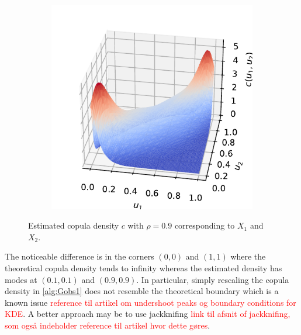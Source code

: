 \documentclass[../Thesis.tex]{subfiles}
\begin{document}
\begin{example}
\begin{figure}[H]
\begin{subfigure}[t]{0.5\linewidth}
            \includegraphics[width = \linewidth]{figures/ND examples/Gaussian copula sample pdf.pdf}
            \caption{}
        \end{subfigure}
        \caption{Estimated copula density $c$ with $\rho = 0.9$ corresponding to $X_1$ and $X_2$.}
        \label{fig:gaussian copula estimate}
    \end{figure}
    The noticeable difference is in the corners $(0,0)$ and $(1,1)$ where the theoretical copula density tends to infinity whereas the estimated density has modes at $(0.1,0.1)$ and $(0.9,0.9)$. In particular, simply rescaling the copula density in \autoref{alg:Gobs1} does not resemble the theoretical boundary which is a known issue \textcolor{red}{reference til artikel om undershoot peaks og boundary conditions for KDE}. A better approach may be to use jackknifing \textcolor{red}{link til afsnit of jackknifing, som også indeholder reference til artikel hvor dette gøres}.
    \begin{figure}[H]
        \centering
        \begin{subfigure}[t]{0.45\linewidth}
            \centering

\end{subfigure}
\end{figure}
\end{example}
\end{document}
